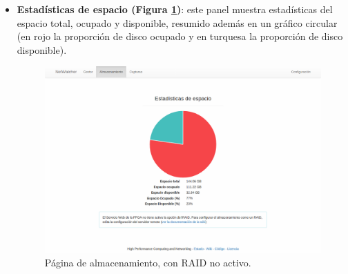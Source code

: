 \begin{itemize}
\item \textbf{Estadísticas de espacio (Figura \ref{fig:captura:espacio})}: este panel muestra estadísticas del espacio total, ocupado y disponible, resumido además en un gráfico circular (en rojo la proporción de disco ocupado y en turquesa la proporción de disco disponible).
\begin{figure}[!htp]
  \centering
  \includegraphics[width=\textwidth,clip=true]{graphics/capturas/almacenamiento_espacio}
  \caption{Página de almacenamiento, con \gls{RAID} no activo.}
  \label{fig:captura:espacio}
\end{figure}


\end{itemize}

